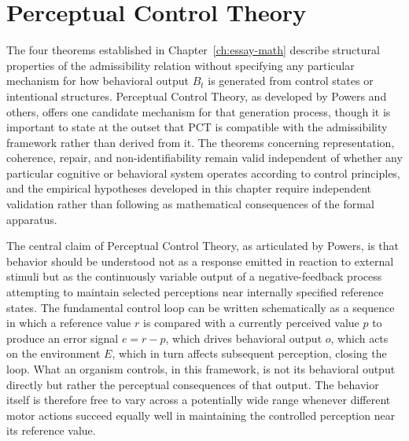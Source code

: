 \chapter{Perceptual Control Theory}
\label{ch:essay-pct}

The four theorems established in Chapter~\ref{ch:essay-math} describe structural properties of the admissibility relation without specifying any particular mechanism for how behavioral output $B_t$ is generated from control states or intentional structures. Perceptual Control Theory, as developed by Powers and others, offers one candidate mechanism for that generation process, though it is important to state at the outset that PCT is compatible with the admissibility framework rather than derived from it. The theorems concerning representation, coherence, repair, and non-identifiability remain valid independent of whether any particular cognitive or behavioral system operates according to control principles, and the empirical hypotheses developed in this chapter require independent validation rather than following as mathematical consequences of the formal apparatus.

The central claim of Perceptual Control Theory, as articulated by Powers, is that behavior should be understood not as a response emitted in reaction to external stimuli but as the continuously variable output of a negative-feedback process attempting to maintain selected perceptions near internally specified reference states. The fundamental control loop can be written schematically as a sequence in which a reference value $r$ is compared with a currently perceived value $p$ to produce an error signal $e = r - p$, which drives behavioral output $o$, which acts on the environment $E$, which in turn affects subsequent perception, closing the loop. What an organism controls, in this framework, is not its behavioral output directly but rather the perceptual consequences of that output. The behavior itself is therefore free to vary across a potentially wide range whenever different motor actions succeed equally well in maintaining the controlled perception near its reference value.

